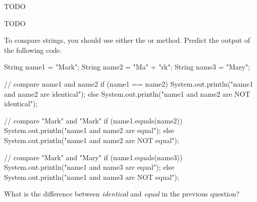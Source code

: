 
TODO




\Q TODO

\begin{answer}
\end{answer}


\Q To compare strings, you should use either the  or  method.
Predict the output of the following code.

\begin{javalst}
String name1 = "Mark";
String name2 = "Ma" + "rk";
String name3 = "Mary";

// compare name1 and name2
if (name1 == name2) {
    System.out.println("name1 and name2 are identical");
} else {
    System.out.println("name1 and name2 are NOT identical");
}

// compare "Mark" and "Mark"
if (name1.equals(name2)) {
    System.out.println("name1 and name2 are equal");
} else {
    System.out.println("name1 and name2 are NOT equal");
}

// compare "Mark" and "Mary"
if (name1.equals(name3)) {
    System.out.println("name1 and name3 are equal");
} else {
    System.out.println("name1 and name3 are NOT equal");
}
\end{javalst}


\Q What is the difference between \emph{identical} and \emph{equal} in the previous question?

\begin{answer}
\end{answer}
